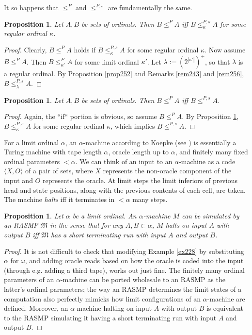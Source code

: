 \documentclass[12pt, twoside]{memoir}
\numberwithin{equation}{section}
\newtheorem{prop}[thm]{Proposition}
\theoremstyle{definition}
\theoremstyle{remark}
\theoremstyle{definition}
\theoremstyle{definition}
\theoremstyle{definition}
\theoremstyle{remark}
\begin{document}
It so happens that $\leq^P$ and $\leq^{P, s}$ are fundamentally the same.

\begin{prop}\label{prop271}
Let $A, B$ be sets of ordinals. Then $B \leq^P A$ iff $B \leq^{P, s}_{\kappa} A$ for some regular ordinal $\kappa$.
\end{prop}

\begin{proof}
Clearly, $B \leq^P A$ holds if $B \leq^{P, s}_{\kappa} A$ for some regular ordinal $\kappa$. Now assume $B \leq^P A$. Then $B \leq^P_{\kappa'} A$ for some limit ordinal $\kappa'$. Let $\lambda := (2^{|\kappa'|})^+$, so that $\lambda$ is a regular ordinal. By Proposition \ref{prop252} and Remarks \ref{rem243} and \ref{rem256}, $B \leq^{P, s}_{\lambda} A$.
\end{proof}

\begin{prop}
Let $A, B$ be sets of ordinals. Then $B \leq^P A$ iff $B \leq^{P, s} A$.
\end{prop}

\begin{proof}
Again, the ``if`` portion is obvious, so assume $B \leq^P A$. By Proposition \ref{prop271}, $B \leq^{P, s}_{\kappa} A$ for some regular ordinal $\kappa$, which implies $B \leq^{P, s} A$.
\end{proof}

For a limit ordinal $\alpha$, an $\alpha$-machine according to Koepke (see \cite{koepke2}) is essentially a Turing machine with tape length $\alpha$, oracle length up to $\alpha$, and finitely many fixed ordinal parameters $< \alpha$. We can think of an input to an $\alpha$-machine as a code $\langle X, O \rangle$ of a pair of sets, where $X$ represents the non-oracle component of the input and $O$ represents the oracle. At limit steps the limit inferiors of previous head and state positions, along with the previous contents of each cell, are taken. The machine \emph{halts} iff it terminates in $< \alpha$ many steps.

\begin{prop}\label{prop270}
Let $\alpha$ be a limit ordinal. An $\alpha$-machine $M$ can be simulated by an RASMP $\mathfrak{M}$ in the sense that for any $A, B \subset \alpha$, $M$ halts on input $A$ with output $B$ iff $\mathfrak{M}$ has a short terminating run with input $A$ and output $B$.
\end{prop}

\begin{proof}
It is not difficult to check that modifying Example \ref{ex228} by substituting $\alpha$ for $\omega$, and adding oracle reads based on how the oracle is coded into the input (through e.g. adding a third tape), works out just fine. The finitely many ordinal parameters of an $\alpha$-machine can be ported wholesale to an RASMP as the latter's ordinal parameters; the way an RASMP determines the limit states of a computation also perfectly mimicks how limit configurations of an $\alpha$-machine are defined. Moreover, an $\alpha$-machine halting on input $A$ with output $B$ is equivalent to the RASMP simulating it having a short terminating run with input $A$ and output $B$.
\end{proof}
\end{document}

